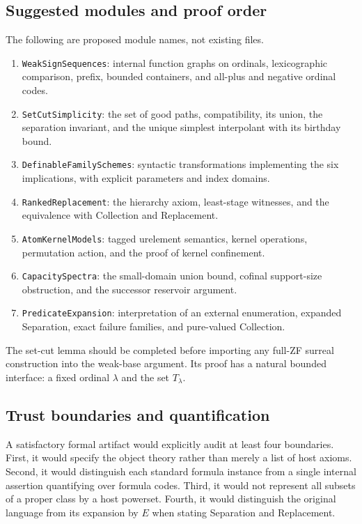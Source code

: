 \documentclass[11pt,letterpaper]{article}
\theoremstyle{definition}
\theoremstyle{remark}
\begin{document}
\subsection{Suggested modules and proof order}
The following are proposed module names, not existing files.
\begin{enumerate}
\item \texttt{WeakSignSequences}: internal function graphs on ordinals, lexicographic comparison, prefix, bounded containers, and all-plus and negative ordinal codes.
\item \texttt{SetCutSimplicity}: the set of good paths, compatibility, its union, the separation invariant, and the unique simplest interpolant with its birthday bound.
\item \texttt{DefinableFamilySchemes}: syntactic transformations implementing the six implications, with explicit parameters and index domains.
\item \texttt{RankedReplacement}: the hierarchy axiom, least-stage witnesses, and the equivalence with Collection and Replacement.
\item \texttt{AtomKernelModels}: tagged urelement semantics, kernel operations, permutation action, and the proof of kernel confinement.
\item \texttt{CapacitySpectra}: the small-domain union bound, cofinal support-size obstruction, and the successor reservoir argument.
\item \texttt{PredicateExpansion}: interpretation of an external enumeration, expanded Separation, exact failure families, and pure-valued Collection.
\end{enumerate}
The set-cut lemma should be completed before importing any full-ZF surreal construction into the weak-base argument. Its proof has a natural bounded interface: a fixed ordinal $\lambda$ and the set $T_\lambda$.

\subsection{Trust boundaries and quantification}
A satisfactory formal artifact would explicitly audit at least four boundaries. First, it would specify the object theory rather than merely a list of host axioms. Second, it would distinguish each standard formula instance from a single internal assertion quantifying over formula codes. Third, it would not represent all subsets of a proper class by a host powerset. Fourth, it would distinguish the original language from its expansion by $E$ when stating Separation and Replacement.
\end{document}
